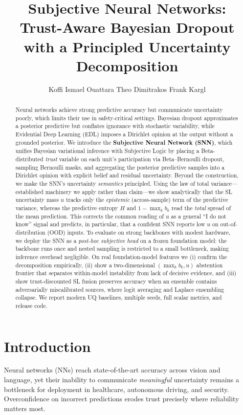 \documentclass[11pt]{article}
\title{Subjective Neural Networks:\\
Trust-Aware Bayesian Dropout with a Principled Uncertainty Decomposition}
\author{Koffi Ismael Ouattara \quad Theo Dimitrakos \quad Frank Kargl}
\date{}
\begin{document}
\maketitle

\begin{abstract}
Neural networks achieve strong predictive accuracy but communicate uncertainty
poorly, which limits their use in safety-critical settings. Bayesian dropout
approximates a posterior predictive but conflates ignorance with stochastic
variability, while Evidential Deep Learning (EDL) imposes a Dirichlet opinion at the
output without a grounded posterior. We introduce the \textbf{Subjective Neural
Network (SNN)}, which unifies Bayesian variational inference with Subjective Logic by
placing a Beta-distributed \emph{trust} variable on each unit's participation via
Beta--Bernoulli dropout, sampling Bernoulli masks, and aggregating the posterior
predictive samples into a Dirichlet opinion with explicit belief and residual
uncertainty. Beyond the construction, we make the SNN's uncertainty \emph{semantics}
principled. Using the law of total variance---established machinery we apply rather
than claim---we show analytically that the SL uncertainty mass $u$ tracks only the
\emph{epistemic} (across-sample) term of the predictive variance, whereas the
predictive entropy $H$ and $1-\max_k b_k$ read the \emph{total} spread of the mean
prediction. This corrects the common reading of $u$ as a general ``I do not know''
signal and predicts, in particular, that a confident SNN reports low $u$ on
out-of-distribution (OOD) inputs. To evaluate on strong backbones with modest
hardware, we deploy the SNN as a \emph{post-hoc subjective head} on a frozen
foundation model: the backbone runs once and nested sampling is restricted to a small
bottleneck, making inference overhead negligible. On real foundation-model features we
(i) confirm the decomposition empirically, (ii) show a two-dimensional
$(\max_k b_k, u)$ abstention frontier that separates within-model instability from
lack of decisive evidence, and (iii) show trust-discounted SL fusion preserves accuracy
when an ensemble contains adversarially miscalibrated sources, where logit averaging
and Laplace ensembling collapse. We report modern UQ baselines, multiple seeds, full
scalar metrics, and release code.
\end{abstract}

\section{Introduction}
Neural networks (NNs) reach state-of-the-art accuracy across vision and language, yet
their inability to communicate \emph{meaningful} uncertainty remains a bottleneck for
deployment in healthcare, autonomous driving, and security. Overconfidence on incorrect
predictions erodes trust precisely where reliability matters most.
\end{document}
